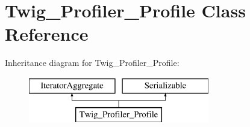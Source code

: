 \hypertarget{classTwig__Profiler__Profile}{}\section{Twig\+\_\+\+Profiler\+\_\+\+Profile Class Reference}
\label{classTwig__Profiler__Profile}
Inheritance diagram for Twig\+\_\+\+Profiler\+\_\+\+Profile\+:\begin{figure}[H]
\begin{center}
\leavevmode
\includegraphics[height=2.000000cm]{classTwig__Profiler__Profile}
\end{center}
\end{figure}
